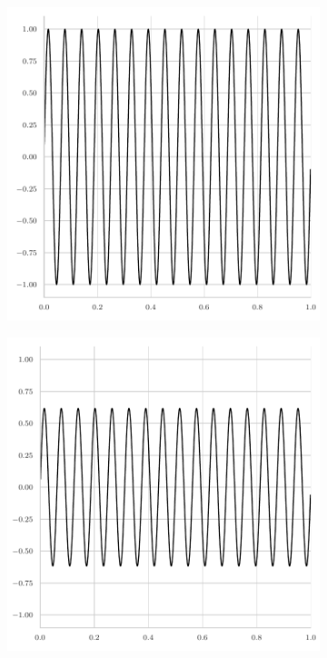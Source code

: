 \begin{figure}
\begin{subfigure}[b]{0.45\textwidth}
	\end{subfigure}
	\begin{subfigure}[b]{0.45\textwidth}
		\centering
		\includegraphics[width=\textwidth]{figures/initial_error_jacobi_32pi.pdf}
	\end{subfigure}
	\hfill
	\begin{subfigure}[b]{0.45\textwidth}
		\centering
		\includegraphics[width=\textwidth]{figures/final_error_jacobi_32pi.pdf}

\end{subfigure}
\end{figure}

